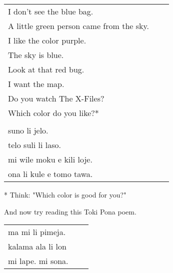 \begin{supertabular}{p{5,5cm}|ll}
   I don't see the blue bag. &&   \\ %
   A little green person came from the sky. &&   \\ %
   I like the color purple.  &&  \\ %
   The sky is blue. &&   \\ %
   Look at that red bug.  &&  \\ %
   I want the map.  &&  \\ %
   Do you watch The X-Files? &&  \\  %
   Which color do you like?* &&  \\  %
 && \\ %
   suno li jelo. &&   \\ %
   telo suli li laso.  &&  \\ %
   mi wile moku e kili loje.  &&  \\ %
   ona li kule e tomo tawa. &&   \\ %
\end{supertabular} 

* Think: "Which color is good for you?" 

And now try reading this Toki Pona poem. 

\begin{supertabular}{p{5,5cm}|ll}
ma mi li pimeja. && \\ %
kalama ala li lon && \\ %
mi lape. mi sona. && \\ %
\end{supertabular} 
